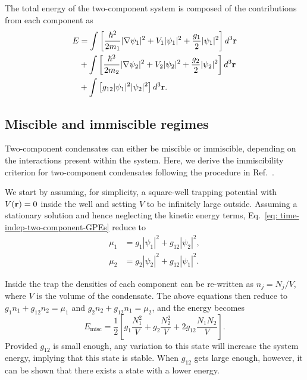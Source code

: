 The total energy of the two-component system is composed of the contributions
from each component as
\begin{equation}
    \begin{aligned}
        E &= \int \left[\frac{\hbar^2}{2m_1}|\nabla\psi_1|^2
        + V_1|\psi_1|^2 + \frac{g_1}{2}|\psi_1|^2 \right] d^3\vb{r}\\
        &+ \int \left[\frac{\hbar^2}{2m_2}|\nabla\psi_2|^2
        + V_2|\psi_2|^2 + \frac{g_2}{2}|\psi_2|^2 \right] d^3\vb{r}\\
        &+ \int \left[g_{12}|\psi_1|^2|\psi_2|^2\right] d^3\vb{r}.
    \end{aligned}
\end{equation}

\subsection{Miscible and immiscible regimes}
Two-component condensates can either be miscible or immiscible, depending on
the interactions present within the system.
Here, we derive the immiscibility criterion for two-component condensates
following the procedure in Ref.~\cite{Ao1998}.

We start by assuming, for simplicity, a square-well trapping potential with
\(V(\vb{r}) = 0\) inside the well and setting \(V\) to be infinitely large
outside.
Assuming a stationary solution and hence neglecting the kinetic energy
terms, Eq.~\eqref{eq: time-indep-two-component-GPEs} reduce to
\begin{equation}
    \begin{aligned}
        \mu_1 &= g_1|\psi_1|^2 + g_{12}|\psi_2|^2, \\
        \mu_2 &= g_2|\psi_2|^2 + g_{12}|\psi_1|^2.
    \end{aligned}
\end{equation}

Inside the trap the densities of each component can be re-written as
\(n_j=N_j/V\), where \(V\) is the volume of the condensate.
The above equations then reduce to \(g_1n_1 + g_{12}n_2 = \mu_1\) and
\(g_2n_2 + g_{12}n_1 = \mu_2\), and the energy becomes
\begin{equation}
    E_\mathrm{misc} = \frac{1}{2}\left[g_1\frac{N_1^2}{V} + g_2\frac{N_2^2}{V}
    + 2g_{12}\frac{N_1N_2}{V}\right].
\end{equation}
Provided \(g_{12}\) is small enough, any variation to this state will increase
the system energy, implying that this state is stable.
When \(g_{12}\) gets large enough, however, it can be shown that there exists
a state with a lower energy.

